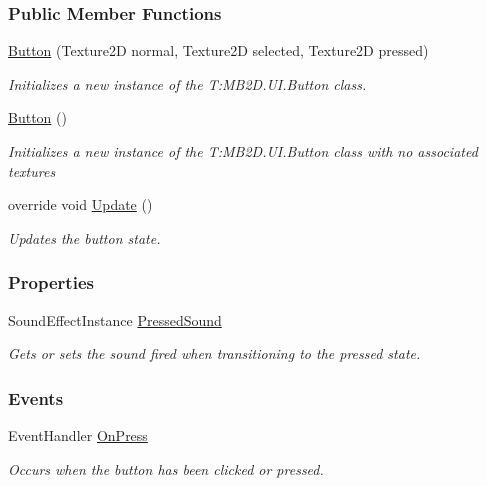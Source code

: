 \subsubsection*{Public Member Functions}
\begin{DoxyCompactItemize}
\item 
\hyperlink{class_m_b2_d_1_1_u_i_1_1_button_a30bf56105fa12c18ebffa1ba3e84cad9}{Button} (Texture2D normal, Texture2D selected, Texture2D pressed)
\begin{DoxyCompactList}\small\item\em Initializes a new instance of the T\+:\+M\+B2\+D.\+U\+I.\+Button class. \end{DoxyCompactList}\item 
\hyperlink{class_m_b2_d_1_1_u_i_1_1_button_a4d9a4339d2ebf59c059a493787790aa4}{Button} ()
\begin{DoxyCompactList}\small\item\em Initializes a new instance of the T\+:\+M\+B2\+D.\+U\+I.\+Button class with no associated textures \end{DoxyCompactList}\item 
override void \hyperlink{class_m_b2_d_1_1_u_i_1_1_button_a1686d24f172e05a1bf83fc3aa49cfab5}{Update} ()
\begin{DoxyCompactList}\small\item\em Updates the button state. \end{DoxyCompactList}\end{DoxyCompactItemize}
\subsubsection*{Properties}
\begin{DoxyCompactItemize}
\item 
Sound\+Effect\+Instance \hyperlink{class_m_b2_d_1_1_u_i_1_1_button_a92d0184df7962dd2aed3b8b0aa8c0d8e}{Pressed\+Sound}
\begin{DoxyCompactList}\small\item\em Gets or sets the sound fired when transitioning to the pressed state. \end{DoxyCompactList}\end{DoxyCompactItemize}
\subsubsection*{Events}
\begin{DoxyCompactItemize}
\item 
Event\+Handler \hyperlink{class_m_b2_d_1_1_u_i_1_1_button_a280d1c552f9e91c7e63811bc498a4f5e}{On\+Press}
\begin{DoxyCompactList}\small\item\em Occurs when the button has been clicked or pressed. \end{DoxyCompactList}\end{DoxyCompactItemize}
